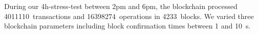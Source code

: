 During our 4h-stress-test between 2pm and 6pm, the blockchain processed
\SI{4011110}{transactions} and \SI{16398274}{operations} in
\SI{4233}{blocks}. We varied three blockchain parameters including block confirmation times between \num{1} and
\SI{10}{s}.
